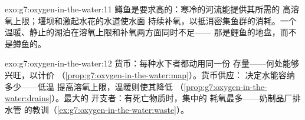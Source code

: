 \begin{solution}{exo:g7:oxygen-in-the-water:11}
鳟鱼是要求高的：寒冷的河流能提供其所需的
高溶氧上限；堰坝和激起水花的水道使水面
持续补氧，以抵消密集鱼群的消耗。一个
温暖、静止的湖泊在溶氧上限和补氧两方面同时不足——
那是鲤鱼的地盘，而不是鳟鱼的。
\end{solution}

\begin{solution}{exo:g7:oxygen-in-the-water:12}
货币：每种水下者都动用同一份
存量——何处能够兴旺，以计价
（\cref{prop:g7:oxygen-in-the-water:map}）。货币供应：
决定水能容纳多少——低温
提高溶氧上限，温暖则使其降低
（\cref{prop:g7:oxygen-in-the-water:drains}）。最大的
开支者：有死亡物质时，集中的
耗氧最多——奶制品厂排水管
的教训（\cref{ex:g7:oxygen-in-the-water:waste}）。
\end{solution}


